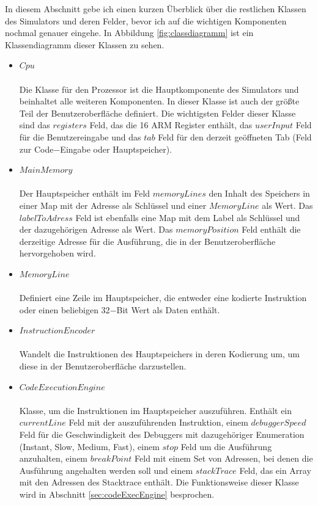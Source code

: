 \documentclass[a4paper, 11pt, onecolumn]{article}
\begin{document}
In diesem Abschnitt gebe ich einen kurzen Überblick über die restlichen Klassen des Simulators und deren Felder, bevor ich auf die wichtigen Komponenten nochmal genauer eingehe. In Abbildung \ref{fig:classdiagramm} ist ein Klassendiagramm dieser Klassen zu sehen.

\begin{itemize}
\item $Cpu$\\ \\Die Klasse für den Prozessor ist die Hauptkomponente des Simulators und beinhaltet alle weiteren Komponenten. In dieser Klasse ist auch der größte Teil der Benutzeroberfläche definiert. Die wichtigsten Felder dieser Klasse sind das $registers$ Feld, das die 16 ARM Register enthält, das $userInput$ Feld für die Benutzereingabe und das $tab$ Feld für den derzeit geöffneten Tab (Feld zur Code$-$Eingabe oder Hauptspeicher).
\item $MainMemory$\\ \\Der Hauptspeicher enthält im Feld $memoryLines$ den Inhalt des Speichers in einer Map mit der Adresse als Schlüssel und einer $MemoryLine$ als Wert. Das $labelToAdress$ Feld ist ebenfalls eine Map mit dem Label als Schlüssel und der dazugehörigen Adresse als Wert. Das $memoryPosition$ Feld enthält die derzeitige Adresse für die Ausführung, die in der Benutzeroberfläche hervorgehoben wird.
\newpage
\item $MemoryLine$\\ \\Definiert eine Zeile im Hauptspeicher, die entweder eine kodierte Instruktion oder einen beliebigen 32$-$Bit Wert als Daten enthält.
\item $InstructionEncoder$\\ \\Wandelt die Instruktionen des Hauptspeichers in deren Kodierung um, um diese in der Benutzeroberfläche darzustellen.
\item $CodeExecutionEngine$\\ \\Klasse, um die Instruktionen im Hauptspeicher auszuführen. Enthält ein $currentLine$ Feld mit der auszuführenden Instruktion, einem $debuggerSpeed$ Feld für die Geschwindigkeit des Debuggers mit dazugehöriger Enumeration (Instant, Slow, Medium, Fast), einem $stop$ Feld um die Ausführung anzuhalten, einem $breakPoint$ Feld mit einem Set von Adressen, bei denen die Ausführung angehalten werden soll und einem $stackTrace$ Feld, das ein Array mit den Adressen des Stacktrace enthält. Die Funktionsweise dieser Klasse wird in Abschnitt \ref{sec:codeExecEngine} besprochen.

\end{itemize}
\end{document}
